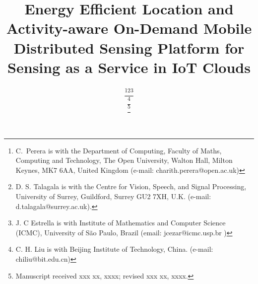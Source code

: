 \documentclass[journal]{IEEEtran}
\begin{document}
\title{Energy Efficient Location and Activity-aware On-Demand Mobile Distributed Sensing Platform  for Sensing as a Service in IoT Clouds}


\author{



















\thanks{C.~Perera is with the
Department of Computing, Faculty of Maths, Computing and Technology, The
Open University, Walton Hall, Milton Keynes, MK7 6AA, United Kingdom
(e-mail: charith.perera@open.ac.uk)}\thanks{D. S. Talagala is with the Centre for Vision, Speech, and Signal Processing, University of Surrey, Guildford, Surrey GU2 7XH, U.K. (e-mail: d.talagala@surrey.ac.uk).}\thanks{J. C Estrella is with Institute of  Mathematics and Computer Science (ICMC), University of  São Paulo, Brazil (email: jcezar@icmc.usp.br )}

\thanks{C. H. Liu is with Beijing Institute of Technology, China. (e-mail: chiliu@bit.edu.cn)}

\thanks{Manuscript received xxx xx, xxxx; revised xxx xx, xxxx.}}



















\maketitle
\end{document}
